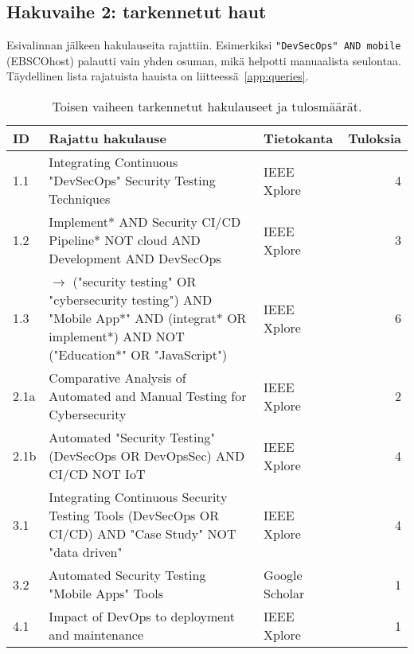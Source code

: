 \documentclass[bscthesis,finnish,oneside,biblatex]{uefcsthesis}
\begin{document}
\subsection{Hakuvaihe 2: tarkennetut haut}
Esivalinnan jälkeen hakulauseita rajattiin. Esimerkiksi
\texttt{"DevSecOps" AND mobile} (EBSCOhost) palautti vain yhden osuman,
mikä helpotti manuaalista seulontaa. Täydellinen lista rajatuista hauista
on liitteessä~\ref{app:queries}.


\begin{table}[htbp]
  \centering
  \footnotesize
  \caption{Toisen vaiheen tarkennetut hakulauseet ja tulosmäärät.}
  \label{tab:second-phase}
  \begin{tabularx}{\textwidth}{l>{\ttfamily\small\raggedright\arraybackslash}X l r}
    \toprule
    \textbf{ID} &
    \textbf{Rajattu hakulause} &
    \textbf{Tietokanta} &
    \textbf{Tuloksia} \\
    \midrule
    1.1  & Integrating Continuous "DevSecOps" Security Testing Techniques                                                            & IEEE Xplore    & 4  \\
    1.2  & Implement* AND Security CI/CD Pipeline* NOT cloud AND Development AND DevSecOps                                           & IEEE Xplore    & 3  \\
    1.3  & 2020 $\rightarrow$ ("security testing" OR "cybersecurity testing") AND "Mobile App*" AND (integrat* OR implement*) AND NOT ("Education*" OR "JavaScript") & IEEE Xplore    & 6  \\
    2.1a & Comparative Analysis of Automated and Manual Testing for Cybersecurity                                                    & IEEE Xplore    & 2  \\
    2.1b & Automated "Security Testing" (DevSecOps OR DevOpsSec) AND CI/CD NOT IoT                                                   & IEEE Xplore    & 4  \\
    3.1  & Integrating Continuous Security Testing Tools (DevSecOps OR CI/CD) AND "Case Study" NOT "data driven"                     & IEEE Xplore    & 4  \\
    3.2  & Automated Security Testing "Mobile Apps" Tools                                                                            & Google Scholar & 1  \\
    4.1  & Impact of DevOps to deployment and maintenance                                                                            & IEEE Xplore    & 1  \\

\end{tabularx}
\end{table}
\end{document}

